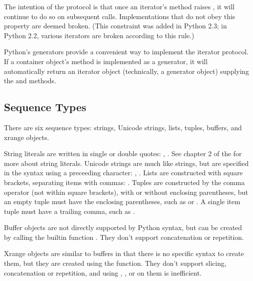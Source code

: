 The intention of the protocol is that once an iterator's
 method raises , it will
continue to do so on subsequent calls.  Implementations that
do not obey this property are deemed broken.  (This constraint
was added in Python 2.3; in Python 2.2, various iterators are
broken according to this rule.)

Python's generators provide a convenient way to implement the
iterator protocol.  If a container object's 
method is implemented as a generator, it will automatically
return an iterator object (technically, a generator object)
supplying the  and  methods.


\subsection{Sequence Types \label{typesseq}}

There are six sequence types: strings, Unicode strings, lists,
tuples, buffers, and xrange objects.

String literals are written in single or double quotes:
, .  See chapter 2 of the
 for more about
string literals.  Unicode strings are much like strings, but are
specified in the syntax using a preceeding  character:
, .  Lists are constructed with square brackets,
separating items with commas: \code{[a, b, c]}.  Tuples are
constructed by the comma operator (not within square brackets), with
or without enclosing parentheses, but an empty tuple must have the
enclosing parentheses, such as  or \code{()}.  A single
item tuple must have a trailing comma, such as .

Buffer objects are not directly supported by Python syntax, but can be
created by calling the builtin function
.  They don't support
concatenation or repetition.

Xrange objects are similar to buffers in that there is no specific
syntax to create them, but they are created using the 
function.  They don't support slicing,
concatenation or repetition, and using , ,
 or  on them is inefficient.

